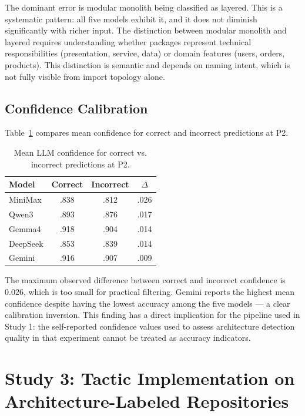 The dominant error is modular monolith being classified as layered. This is a systematic pattern: all five models exhibit it, and it does not diminish significantly with richer input. The distinction between modular monolith and layered requires understanding whether packages represent technical responsibilities (presentation, service, data) or domain features (users, orders, products). This distinction is semantic and depends on naming intent, which is not fully visible from import topology alone.

\subsection{Confidence Calibration}
\label{subsec:eval_confidence}

Table~\ref{tab:eval_confidence} compares mean confidence for correct and incorrect predictions at P2.

\begin{table}[H]
\centering
\small
\caption{Mean LLM confidence for correct vs. incorrect predictions at P2.}
\label{tab:eval_confidence}
\begin{tabular}{lccc}
\toprule
\textbf{Model} & \textbf{Correct} & \textbf{Incorrect} & $\Delta$ \\
\midrule
MiniMax  & .838 & .812 & .026 \\
Qwen3    & .893 & .876 & .017 \\
Gemma4   & .918 & .904 & .014 \\
DeepSeek & .853 & .839 & .014 \\
Gemini   & .916 & .907 & .009 \\
\bottomrule
\end{tabular}
\end{table}

The maximum observed difference between correct and incorrect confidence is 0.026, which is too small for practical filtering. Gemini reports the highest mean confidence despite having the lowest accuracy among the five models --- a clear calibration inversion. This finding has a direct implication for the pipeline used in Study 1: the self-reported confidence values used to assess architecture detection quality in that experiment cannot be treated as accuracy indicators.

\section{Study 3: Tactic Implementation on Architecture-Labeled Repositories}
\label{sec:eval_study3}

